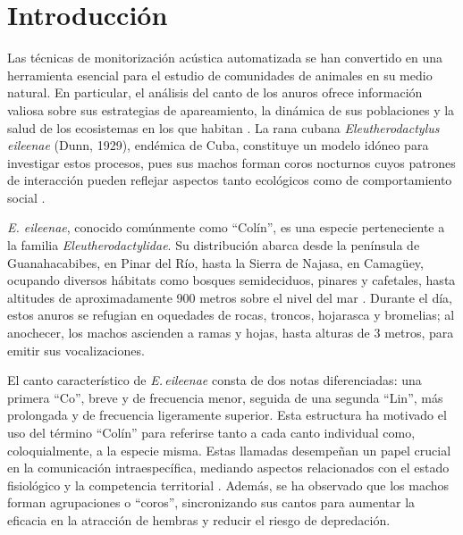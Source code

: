 \chapter*{Introducción}\label{chapter:introduction}

\qquad 


Las técnicas de monitorización acústica automatizada se han 
convertido en una herramienta esencial para el estudio de 
comunidades de animales en su medio natural. En particular, el 
análisis del canto de los anuros ofrece información valiosa 
sobre sus estrategias de apareamiento, la dinámica de sus 
poblaciones y la salud de los ecosistemas en los que habitan \cite{blumstein2011acoustic}. 
La rana cubana \emph{Eleutherodactylus eileenae} (Dunn, 1929), 
endémica de Cuba, constituye un modelo idóneo para investigar 
estos procesos, pues sus machos forman coros nocturnos cuyos 
patrones de interacción pueden reflejar aspectos tanto 
ecológicos como de comportamiento social \cite{alonso2001patrones}.


\emph{E. eileenae}, conocido comúnmente como “Colín”, es una especie perteneciente 
a la familia \emph{Eleutherodactylidae}. Su distribución abarca desde la península 
de Guanahacabibes, en Pinar del Río, hasta la Sierra de Najasa, en Camagüey, ocupando 
diversos hábitats como bosques semideciduos, pinares y cafetales, hasta altitudes de 
aproximadamente 900 metros sobre el nivel del mar \cite{alonso2001patrones,schwartz1958new,estrada1994herpetofauna}. Durante 
el día, estos anuros se refugian en oquedades de rocas, troncos, hojarasca y 
bromelias; al anochecer, los machos ascienden a ramas y hojas, hasta alturas de 3 
metros, para emitir sus vocalizaciones.

El canto característico de \emph{E.\,eileenae} consta de dos notas diferenciadas: 
una primera “Co”, breve y de frecuencia menor, seguida de una segunda “Lin”, más 
prolongada y de frecuencia ligeramente superior. Esta estructura ha motivado el uso 
del término “Colín” para referirse tanto a cada canto individual como, 
coloquialmente, a la especie misma. Estas llamadas desempeñan un papel crucial en la 
comunicación intraespecífica, mediando aspectos relacionados con el estado 
fisiológico y la competencia territorial \cite{alonso2001patrones}. Además, se ha observado que los machos 
forman agrupaciones o “coros”, sincronizando sus cantos para aumentar la eficacia en 
la atracción de hembras y reducir el riesgo de depredación.

